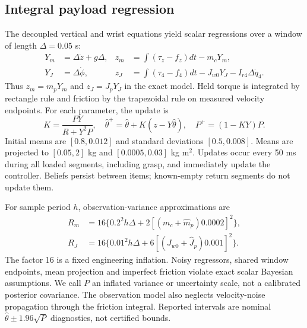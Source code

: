 \documentclass[10pt,twocolumn]{article}
\begin{document}
\subsection{Integral payload regression}
The decoupled vertical and wrist equations yield scalar regressions over a window of length $\Delta=0.05$ s:
\begin{align}
 Y_m&=\Delta\dot z+g\Delta, & z_m&=\int(\tau_z-f_z)dt-m_cY_m,\\
 Y_J&=\Delta\dot\phi, & z_J&=\int(\tau_4-f_4)dt-J_{w0}Y_J-I_{r4}\Delta\dot q_4.
\end{align}
Thus $z_m=m_pY_m$ and $z_J=J_pY_J$ in the exact model. Held torque is integrated by rectangle rule and friction by the trapezoidal rule on measured velocity endpoints. For each parameter, the update is
\begin{equation}
 K=\frac{PY}{R+Y^2P},\quad \hat\theta^+=\hat\theta+K(z-Y\hat\theta),\quad P^+=(1-KY)P.
\end{equation}
Initial means are $[0.8,0.012]$ and standard deviations $[0.5,0.008]$. Means are projected to $[0.05,2]$ kg and $[0.0005,0.03]$ kg m$^2$. Updates occur every 50 ms during all loaded segments, including grasp, and immediately update the controller. Beliefs persist between items; known-empty return segments do not update them.

For sample period $h$, observation-variance approximations are
\begin{align}
 R_m&=16\{0.2^2h\Delta+2[(m_c+\hat m_p)0.0002]^2\},\\
 R_J&=16\{0.01^2h\Delta+6[(J_{w0}+\hat J_p)0.001]^2\}.
\end{align}
The factor 16 is a fixed engineering inflation. Noisy regressors, shared window endpoints, mean projection and imperfect friction violate exact scalar Bayesian assumptions. We call $P$ an inflated variance or uncertainty scale, not a calibrated posterior covariance. The observation model also neglects velocity-noise propagation through the friction integral. Reported intervals are nominal $\hat\theta\pm1.96\sqrt P$ diagnostics, not certified bounds.
\end{document}
